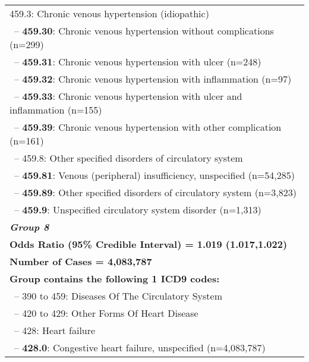 \begin{longtable}{p{\textwidth}}
459.3: Chronic venous hypertension (idiopathic)} \\ \-\ \hspace{40pt}\footnotesize{-- {\color{ForestGreen} \textbf{459.30}}: Chronic venous hypertension without complications (n=299)} \\ \-\ \hspace{40pt}\footnotesize{-- {\color{ForestGreen} \textbf{459.31}}: Chronic venous hypertension with ulcer (n=248)} \\ \-\ \hspace{40pt}\footnotesize{-- {\color{ForestGreen} \textbf{459.32}}: Chronic venous hypertension with inflammation (n=97)} \\ \-\ \hspace{40pt}\footnotesize{-- {\color{ForestGreen} \textbf{459.33}}: Chronic venous hypertension with ulcer and inflammation (n=155)} \\ \-\ \hspace{40pt}\footnotesize{-- {\color{ForestGreen} \textbf{459.39}}: Chronic venous hypertension with other complication (n=161)} \\ \-\ \hspace{30pt}\footnotesize{-- 459.8: Other specified disorders of circulatory system} \\ \-\ \hspace{40pt}\footnotesize{-- {\color{ForestGreen} \textbf{459.81}}: Venous (peripheral) insufficiency, unspecified (n=54,285)} \\ \-\ \hspace{40pt}\footnotesize{-- {\color{ForestGreen} \textbf{459.89}}: Other specified disorders of circulatory system (n=3,823)} \\ \-\ \hspace{30pt}\footnotesize{-- {\color{ForestGreen} \textbf{459.9}}: Unspecified circulatory system disorder (n=1,313)} \\  
 \hline 
 
 \textbf{\emph{Group 8}}\\ 
\textbf{Odds Ratio (95\% Credible Interval) = 1.019 (1.017,1.022)} \\ \textbf{Number of Cases = 4,083,787} \\ \textbf{Group contains the following 1 ICD9 codes:} \\ \-\ \hspace{ 0pt}\footnotesize{-- 390 to 459: Diseases Of The Circulatory System} \\ \-\ \hspace{10pt}\footnotesize{-- 420 to 429: Other Forms Of Heart Disease} \\ \-\ \hspace{20pt}\footnotesize{-- 428: Heart failure} \\ \-\ \hspace{30pt}\footnotesize{-- {\color{ForestGreen} \textbf{428.0}}: Congestive heart failure, unspecified (n=4,083,787)} \\ 
 
\end{longtable}
